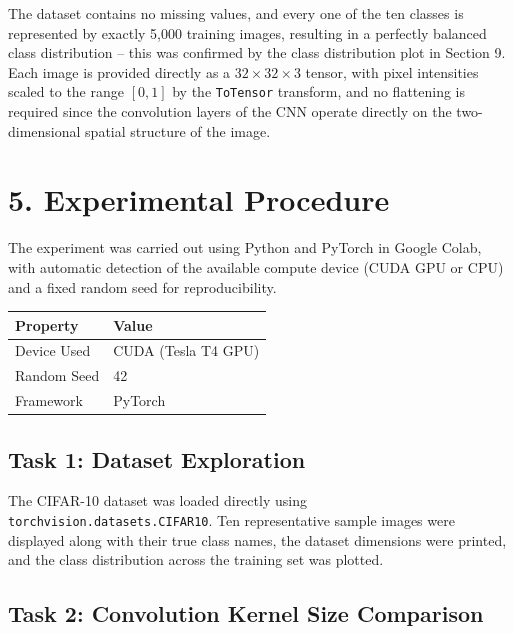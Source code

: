 \documentclass[11pt,a4paper]{article}
\begin{document}
\vspace{0.3cm}

The dataset contains no missing values, and every one of the ten classes is represented by exactly 5{,}000 training images, resulting in a perfectly balanced class distribution -- this was confirmed by the class distribution plot in Section 9. Each image is provided directly as a $32\times32\times3$ tensor, with pixel intensities scaled to the range $[0,1]$ by the \texttt{ToTensor} transform, and no flattening is required since the convolution layers of the CNN operate directly on the two-dimensional spatial structure of the image.

\section*{5. Experimental Procedure}

The experiment was carried out using Python and PyTorch in Google Colab, with automatic detection of the available compute device (CUDA GPU or CPU) and a fixed random seed for reproducibility.

\begin{center}
\begin{tabular}{|p{5cm}|p{7cm}|}
\hline
\textbf{Property} & \textbf{Value}\\
\hline
Device Used & CUDA (Tesla T4 GPU)\\
\hline
Random Seed & 42\\
\hline
Framework & PyTorch\\
\hline
\end{tabular}
\end{center}

\vspace{0.3cm}

\subsection*{Task 1: Dataset Exploration}

The CIFAR-10 dataset was loaded directly using \texttt{torchvision.datasets.CIFAR10}. Ten representative sample images were displayed along with their true class names, the dataset dimensions were printed, and the class distribution across the training set was plotted.

\subsection*{Task 2: Convolution Kernel Size Comparison}
\end{document}
